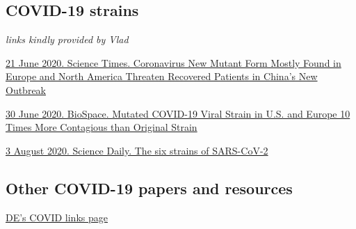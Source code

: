 \documentclass[12pt]{article}
\begin{document}
\subsection*{COVID-19 strains}

\emph{links kindly provided by Vlad}

\href{https://www.sciencetimes.com/articles/26141/20200621/coronavirus-new-mutant-
form-mostly-found-europe-north-america-threaten-recovered-patients-china-new
-outbreak.htm}{21 June 2020.  Science Times.  Coronavirus New Mutant Form Mostly Found in Europe and North America Threaten Recovered Patients in China’s New Outbreak}

\href{https://www.biospace.com/article/mutated-covid-19-viral-strain-in-us-and-eur
ope-much-more-contagious/}{30 June 2020.  BioSpace.  Mutated COVID-19 Viral Strain in U.S. and Europe 10 Times More Contagious than Original Strain}

\href{https://www.sciencedaily.com/releases/2020/08/200803105246.htm}{3
August 2020.  Science Daily.  The six strains of SARS-CoV-2}


\subsection*{Other COVID-19 papers and resources}

\href{https://github.com/mac-theobio/Lab_meeting/blob/master/covid-19/README.md}{DE's COVID links page}



\end{document}
